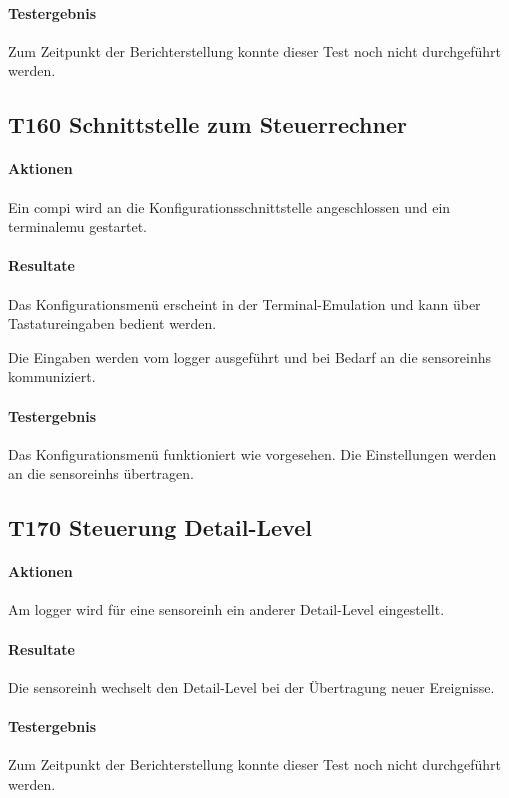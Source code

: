 \paragraph{Testergebnis} Zum Zeitpunkt der Berichterstellung konnte dieser Test noch nicht durchgeführt werden. 

\subsection{T160 Schnittstelle zum Steuerrechner}
\paragraph{Aktionen} Ein \gls{compi} wird an die Konfigurationsschnittstelle angeschlossen und ein \gls{terminalemu} gestartet.

\paragraph{Resultate} Das Konfigurationsmenü erscheint in der Terminal-Emulation und kann über Tastatureingaben bedient werden.

Die Eingaben werden vom \gls{logger} ausgeführt und bei Bedarf an die \glspl{sensoreinh} kommuniziert.

\paragraph{Testergebnis} Das Konfigurationsmenü funktioniert wie vorgesehen. Die Einstellungen werden an die \glspl{sensoreinh} übertragen.

\subsection{T170 Steuerung Detail-Level}
\paragraph{Aktionen} Am \gls{logger} wird für eine \gls{sensoreinh} ein anderer Detail-Level eingestellt.

\paragraph{Resultate} Die \gls{sensoreinh} wechselt den Detail-Level bei der Übertragung neuer Ereignisse.

\paragraph{Testergebnis} Zum Zeitpunkt der Berichterstellung konnte dieser Test noch nicht durchgeführt werden. 

